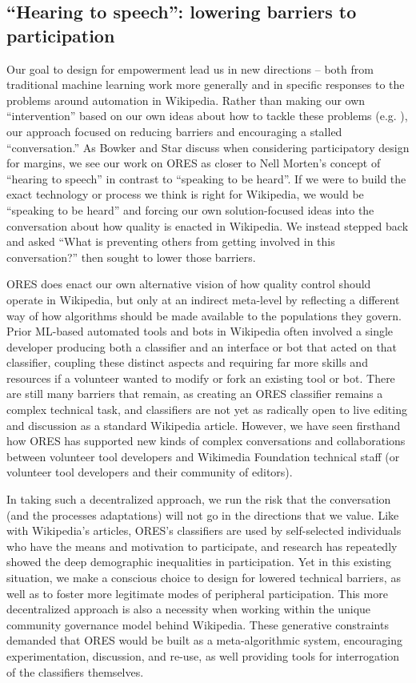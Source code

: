 \subsection{``Hearing to speech'': lowering barriers to participation}
Our goal to design for empowerment lead us in new directions -- both from traditional machine learning work more generally and in specific responses to the problems around automation in Wikipedia. Rather than making our own ``intervention'' based on our own ideas about how to tackle these problems (e.g. \cite{halfaker2014snuggle}), our approach focused on reducing barriers and encouraging a stalled ``conversation.'' As Bowker and Star discuss when considering participatory design for margins\cite{bowker1999sorting}, we see our work on ORES as closer to Nell Morten's concept of ``hearing to speech'' in contrast to ``speaking to be heard\cite{morton1985journey}''. If we were to build the exact technology or process we think is right for Wikipedia, we would be ``speaking to be heard'' and forcing our own solution-focused ideas into the conversation about how quality is enacted in Wikipedia. We instead stepped back and asked ``What is preventing others from getting involved in this conversation?'' then sought to lower those barriers.

ORES does enact our own alternative vision of how quality control should operate in Wikipedia, but only at an indirect meta-level by reflecting a different way of how algorithms should be made available to the populations they govern. Prior ML-based automated tools and bots in Wikipedia often involved a single developer producing both a classifier and an interface or bot that acted on that classifier, coupling these distinct aspects and requiring far more skills and resources if a volunteer wanted to modify or fork an existing tool or bot. There are still many barriers that remain, as creating an ORES classifier remains a complex technical task, and classifiers are not yet as radically open to live editing and discussion as a standard Wikipedia article. However, we have seen firsthand how ORES has supported new kinds of complex conversations and collaborations between volunteer tool developers and Wikimedia Foundation technical staff (or volunteer tool developers and their community of editors).

In taking such a decentralized approach, we run the risk that the conversation (and the processes adaptations) will not go in the directions that we value. Like with Wikipedia's articles, ORES's classifiers are used by self-selected individuals who have the means and motivation to participate, and research has repeatedly showed the deep demographic inequalities in participation\cite{lam2011wp,graham2014uneven}. Yet in this existing situation, we make a conscious choice to design for lowered technical barriers, as well as to foster more legitimate modes of peripheral participation. This more decentralized approach is also a necessity when working within the unique community governance model behind Wikipedia.  These generative constraints demanded that ORES would be built as a meta-algorithmic system, encouraging experimentation, discussion, and re-use, as well providing tools for interrogation of the classifiers themselves.

